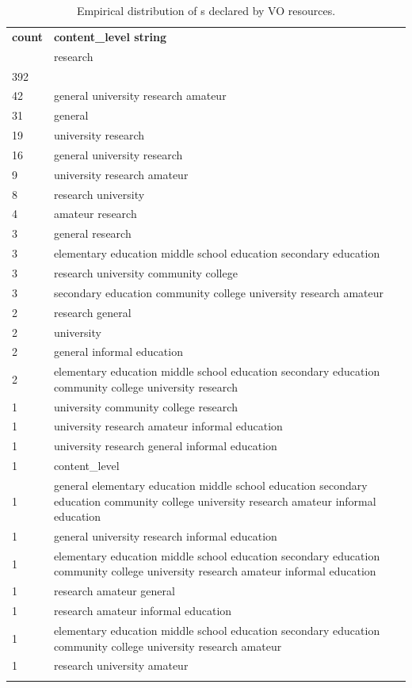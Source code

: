 \documentclass{ivoa}
\begin{document}
\begin{table}
\begin{tabular}{lp{12cm}}
\sptablerule
\textbf{count}&
\textbf{content\_level string}\\
\sptablerule
  18875 & research\\
  392 & \\
  42 & general university research amateur\\
  31 & general\\
  19 & university research\\
  16 & general university research\\
  9 & university research amateur\\
  8 & research university\\
  4 & amateur research\\
  3 & general research\\
  3 & elementary education middle school education secondary education\\
  3 & research university community college\\
  3 & secondary education community college university research amateur\\
  2 & research general\\
  2 & university\\
  2 & general informal education\\
  2 & elementary education middle school education secondary education community college university research\\
  1 & university community college research\\
  1 & university research amateur informal education\\
  1 & university research general informal education\\
  1 & content\_level\\
  1 & general elementary education middle school education secondary education community college university research amateur informal education\\
  1 & general university research informal education\\
  1 & elementary education middle school education secondary education community college university research amateur informal education\\
  1 & research amateur general\\
  1 & research amateur informal education\\
  1 & elementary education middle school education secondary education community college university research amateur\\
  1 & research university amateur\\
\sptablerule
\end{tabular}
\caption{Empirical distribution of s declared by VO
resources.}
\label{tab:cldist}
\end{table}
\end{document}
